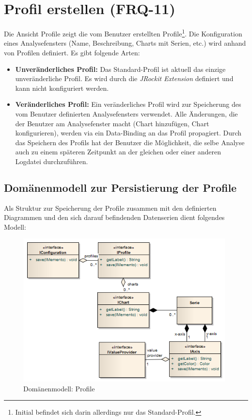 \section{Profil erstellen (FRQ-11)}
Die Ansicht Profile zeigt die vom Benutzer erstellten Profile\footnote{Initial befindet sich darin allerdings nur das Standard-Profil.}. Die Konfiguration eines Analysefensters (Name, Beschreibung, Charts mit Serien, etc.) wird anhand von Profilen definiert. Es gibt folgende  Arten:
\begin{itemize}
	\item \textbf{Unveränderliches Profil:} Das Standard-Profil ist aktuell das einzige unveränderliche Profil. Es wird durch die \textit{JRockit Extension} definiert und kann nicht konfiguriert werden.
	\item \textbf{Veränderliches Profil:} Ein veränderliches Profil wird zur Speicherung des vom Benutzer definierten Analysefensters verwendet. Alle Änderungen, die der Benutzer am Analysefenster macht (Chart hinzufügen, Chart konfigurieren), werden via ein Data-Binding an das Profil propagiert. Durch das Speichern des Profils hat der Benutzer die Möglichkeit, die selbe Analyse auch zu einem späteren Zeitpunkt an der gleichen oder einer anderen Logdatei durchzuführen.
\end{itemize}

\subsection{Domänenmodell zur Persistierung der Profile}\label{domain_profile}
Als Struktur zur Speicherung der Profile zusammen mit den definierten Diagrammen und den sich darauf befindenden Datenserien dient folgendes Modell:
 \begin{figure}[H]
  	\centering
    	\includegraphics[width=11cm]{images/core_domain_profiles}
        	\caption{Domänenmodell: Profile}
\end{figure}

